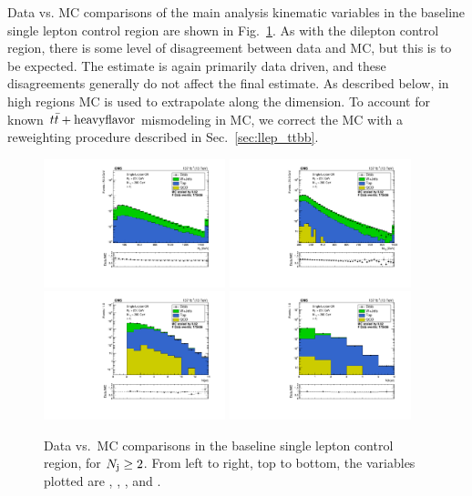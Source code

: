 Data vs. MC comparisons of the main analysis kinematic variables in the baseline single lepton
control region are shown in Fig.~\ref{fig:llep_crplots}. As with the dilepton control region,
there is some level of disagreement between data and MC, but this is to be expected. The 
estimate is again primarily data driven, and these disagreements generally do not affect the
final estimate. As described below, in high \Nj regions MC is used to extrapolate along the
\Nb dimension. To account for known $t\bar{t}+\mathrm{heavy flavor}$ mismodeling in MC, we correct the MC 
with a reweighting procedure described in Sec.~\ref{sec:llep_ttbb}.

\begin{figure}[ht]
  \begin{center}
    \includegraphics[width=0.47\textwidth]{figs/llep/crslbase_ht.pdf}
    \includegraphics[width=0.47\textwidth]{figs/llep/crslbase_mt2.pdf} \\
    \includegraphics[width=0.47\textwidth]{figs/llep/crslbase_nJet30.pdf}
    \includegraphics[width=0.47\textwidth]{figs/llep/crslbase_nBJet20.pdf} \\
    \caption{Data vs.\ MC comparisons in the baseline single lepton control region, for $N_{\mathrm{j}}\geq2$.
      From left to right, top to bottom, the variables
      plotted are \Ht, \mttwo, \Nj, and \Nb.
            }
    \label{fig:llep_crplots}
  \end{center}
\end{figure}

